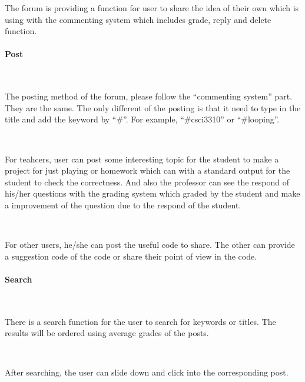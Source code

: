 The forum is providing a function for user to share the idea of their own which is using with the commenting system which includes grade, reply and delete function.

\paragraph{Post}~

The posting method of the forum, please follow the “commenting system” part. They are the same. The only different of the posting is that it need to type in the title and add the keyword by “\#”. For example, “\#csci3310” or “\#looping”.\par~

For teahcers, user can post some interesting topic for the student to make a project for just playing or homework which can with a standard output for the student to check the correctness. And also the professor can see the respond of his/her questions with the grading system which graded by the student and make a improvement of the question due to the respond of the student.\par~

For other users, he/she can post the useful code to share. The other can provide a suggestion code of the code or share their point of view in the code.

  \paragraph{Search}~

There is a search function for the user to search for keywords or titles. The results will be ordered using average grades of the posts.\par~

After searching, the user can slide down and click into the corresponding post.
